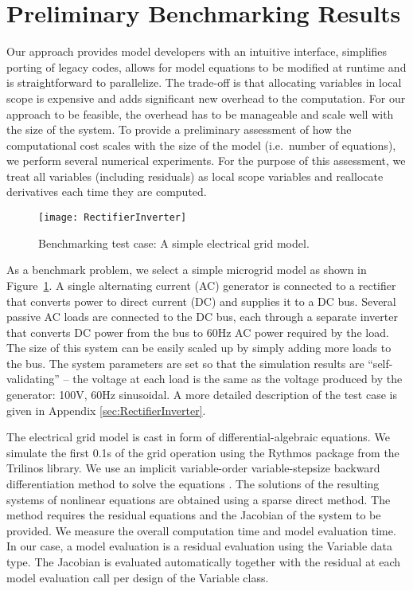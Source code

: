 \documentclass[10pt]{ijnam}
\theoremstyle{definition}
\begin{document}
\section{Preliminary Benchmarking Results} \label{sec:benchmarking}

Our approach provides model developers with an intuitive interface, 
simplifies porting of legacy codes, allows for model equations to be 
modified at runtime and is straightforward to parallelize. The trade-off 
is that allocating variables in local scope is expensive and adds significant 
new overhead to the computation. For our approach to be feasible, the 
overhead has to be manageable and scale well with the size of the system.
To provide a preliminary 
assessment of how the computational cost scales with the size of the model 
(i.e.\ number of equations), we perform several numerical experiments. 
For the purpose of this assessment, we treat all variables (including residuals) 
as local scope variables and reallocate derivatives each time they are computed.

\begin{figure}[htb]
    \centering
    \texttt{[image: RectifierInverter]} 
    \caption{Benchmarking test case: A simple electrical grid model.}
    \label{fig:grid}
\end{figure}

As a benchmark problem, we select a simple microgrid model 
as shown in Figure~\ref{fig:grid}. A single alternating current (AC) generator is connected
to a rectifier that converts power to direct current (DC) and supplies it to a DC bus. 
Several passive AC loads are connected to the DC bus, each through a separate 
inverter that converts DC power from the bus to 60\unit{Hz} AC power required 
by the load. The size of this system can be easily scaled up by simply 
adding more loads to the bus. The system parameters are set so that the
simulation results are ``self-validating'' -- the voltage at each load 
is the same as the voltage produced by the generator: 100\unit{V}, 60\unit{Hz} 
sinusoidal. A more detailed description of the test case is given in Appendix 
\ref{sec:RectifierInverter}.

The electrical grid model is cast in form of differential-algebraic equations. 
We simulate the first 0.1\unit{s} of the grid operation using the Rythmos package from
the Trilinos library. We use an implicit variable-order variable-stepsize backward 
differentiation method to solve the equations \cite{hindmarsh2005}.
The solutions of the resulting systems of nonlinear equations are obtained using a sparse direct method.
The method requires the residual equations and the Jacobian of the system to be provided. We measure the overall computation
time and model evaluation time. In our case, a model evaluation is a residual 
evaluation using the Variable data type. The Jacobian is evaluated automatically
together with the residual at each model evaluation call per design of the Variable 
class. 
\end{document}
